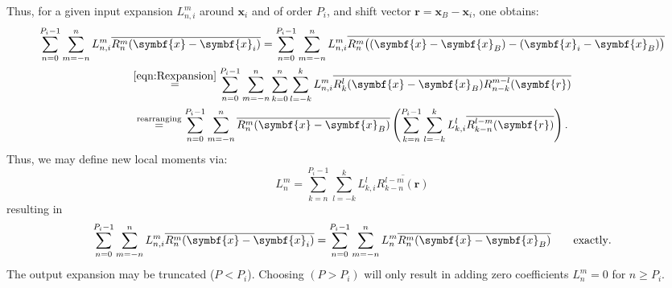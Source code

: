 \documentclass{scrbook}
\newcommand{\vv}[1]{\ensuremath{\symbf{#1}}} %
\begin{document}
Thus, for a given input expansion $L_{n,i}^m$ around $\vv{x}_i$ and of order
$P_i$, and shift vector $\vv{r}=\vv{x}_B-\vv{x}_i$, one obtains:
\begin{multline}
\sum_{n=0}^{P_i-1}\sum_{m=-n\vphantom{0}}^n
L_{n,i}^m\overline{R_n^m(\vv{x}-\vv{x}_i)}
=
\sum_{n=0}^{P_i-1}\sum_{m=-n\vphantom{0}}^n
L_{n,i}^m\overline{R_n^m\bigl((\vv{x}-\vv{x}_B)-(\vv{x}_i-\vv{x}_B)\bigr)} \\
\stackrel{\eqref{eqn:Rexpansion}}{=}
\sum_{n=0}^{P_i-1}\sum_{m=-n\vphantom{0}}^n\sum_{k=0}^n\sum_{l=-k}^kL_{n,i}^m
\overline{R_{k}^{l}(\vv{x}-\vv{x}_B)R_{n-k}^{m-l}(\vv{r})} \\
\stackrel{\text{rearranging}}{=}
\sum_{n=0}^{P_i-1}\sum_{m=-n\vphantom{0}}^n \overline{R_n^m(\vv{x}-\vv{x}_B)}
\left(
\sum_{k=n}^{P_i-1}\sum_{l=-k}^k
L_{k,i}^l\overline{R_{k-n}^{l-m}(\vv{r})}
\right).
\end{multline}
Thus, we may define new local moments via:
\begin{equation}
L_n^m =\sum_{k=n}^{P_i-1}\sum_{l=-k}^k L_{k,i}^l\overline{R_{k-n}^{l-m}(\vv{r})}
\end{equation}
resulting in
\begin{equation}
\sum_{n=0}^{P_i-1}\sum_{m=-n\vphantom{0}}^n
L_{n,i}^m\overline{R_n^m(\vv{x}-\vv{x}_i)}
=
\sum_{n=0}^{P_i-1}\sum_{m=-n\vphantom{0}}^n
L_{n}^m\overline{R_n^m(\vv{x}-\vv{x}_B)}
\qquad\text{exactly}.
\end{equation}
The output expansion may be truncated ($P<P_i$). Choosing $(P>P_i)$ will only
result in adding zero coefficients $L_n^m=0$ for $n\geq P_i$.
\end{document}
